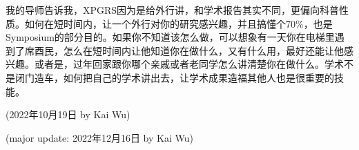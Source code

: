我的导师告诉我，XPGRS因为是给外行讲，和学术报告其实不同，更偏向科普性质。如何在短时间内，让一个外行对你的研究感兴趣，并且搞懂个70\%，也是Symposium的部分目的。如果你不知道该怎么做，可以想象有一天你在电梯里遇到了席酉民，怎么在短时间内让他知道你在做什么，又有什么用，最好还能让他感兴趣。或者是，过年回家跟你哪个亲戚或者老同学怎么讲清楚你在做什么。学术不是闭门造车，如何把自己的学术讲出去，让学术成果造福其他人也是很重要的技能。

\begin{flushright}
(2022年10月19日 by Kai Wu)

(major update: 2022年12月16日 by Kai Wu)
\end{flushright}